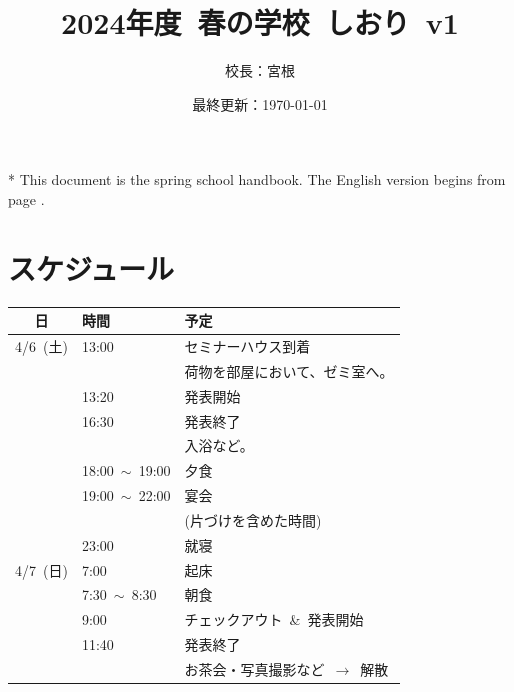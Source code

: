 \documentclass[unicode,a4paper,11pt]{ltjsarticle}
\title{
    2024年度\ 春の学校\ しおり\ v1
}
\author{
  校長：宮根
}
\date{最終更新：\today}
\begin{document}
\maketitle

* This document is the spring school handbook. The English version begins from page \pageref{eng_page}.

\tableofcontents



\clearpage

\section{スケジュール}

\begin{center}
  \begin{tabular}{cll}\hline
    日        & 時間                 & 予定                                      \\ \hline
    4/6\ (土) & 13:00                & セミナーハウス到着                        \\
              &                      & 荷物を部屋において、ゼミ室へ。            \\
              & 13:20                & 発表開始                                  \\
              & 16:30                & 発表終了                                  \\
              &                      & 入浴など。                                \\
              & 18:00\ $\sim$\ 19:00 & 夕食                                      \\
              & 19:00\ $\sim$\ 22:00 & 宴会                                      \\
              &                      & (片づけを含めた時間)                      \\
              & 23:00                & 就寝                                      \\ \hline
    4/7\ (日) & 7:00                 & 起床                                      \\
              & 7:30\ $\sim$\  8:30  & 朝食                                      \\
              & 9:00                 & チェックアウト\ \&\ 発表開始              \\
              & 11:40                & 発表終了                                  \\
              &                      & お茶会・写真撮影など\ $\rightarrow$\ 解散 \\ \hline
  \end{tabular}
\end{center}
\end{document}
